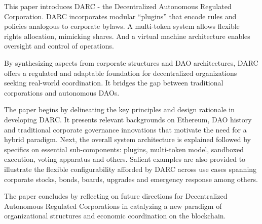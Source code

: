 \documentclass{article}
\begin{document}
This paper introduces DARC - the Decentralized Autonomous Regulated Corporation. DARC incorporates modular ``plugins'' that encode rules and policies analogous to corporate bylaws. A multi-token system allows flexible rights allocation, mimicking shares. And a virtual machine architecture enables oversight and control of operations.

By synthesizing aspects from corporate structures and DAO architectures, DARC offers a regulated and adaptable foundation for decentralized organizations seeking real-world coordination. It bridges the gap between traditional corporations and autonomous DAOs.

The paper begins by delineating the key principles and design rationale in developing DARC. It presents relevant backgrounds on Ethereum, DAO history and traditional corporate governance innovations that motivate the need for a hybrid paradigm. Next, the overall system architecture is explained followed by specifics on essential sub-components: plugins, multi-token model, sandboxed execution, voting apparatus and others. Salient examples are also provided to illustrate the flexible configurability afforded by DARC across use cases spanning corporate stocks, bonds, boards, upgrades and emergency response among others.

The paper concludes by reflecting on future directions for Decentralized Autonomous Regulated Corporations in catalyzing a new paradigm of organizational structures and economic coordination on the blockchain.







































\end{document}
